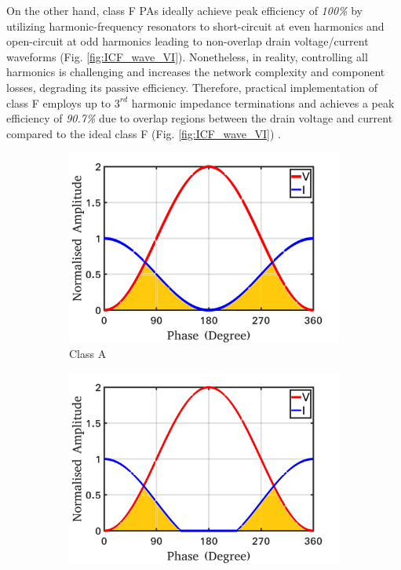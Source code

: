 \documentclass[conference]{IEEEtran}
\begin{document}
On the other hand, class F PAs ideally achieve peak efficiency of \textit{100\%} by utilizing harmonic-frequency resonators to short-circuit at even harmonics and open-circuit at odd harmonics leading to non-overlap drain voltage/current waveforms (Fig. \ref{fig:ICF_wave_VI}). Nonetheless, in reality, controlling all harmonics is challenging and increases the network complexity and component losses, degrading its passive efficiency. Therefore, practical implementation of class F employs up to $3^{rd}$ harmonic impedance terminations and achieves a peak efficiency of \textit{90.7\%} due to overlap regions between the drain voltage and current compared to the ideal class F (Fig. \ref{fig:ICF_wave_VI}) \cite{Raab_max_eff}.
\begin{figure}[!t]
\centering
\captionsetup{font=footnotesize}
\begin{subfigure}{0.24\textwidth}
\includegraphics[width=1\textwidth]{Images/Intro/ClassA_shaded.jpg}
\caption{Class A}
\label{fig:CA_wave_VI}
\end{subfigure}
\begin{subfigure}{0.24\textwidth}
\includegraphics[width=1\textwidth]{Images/Intro/ClassB_shaded.jpg}

\end{subfigure}
\end{figure}
\end{document}
